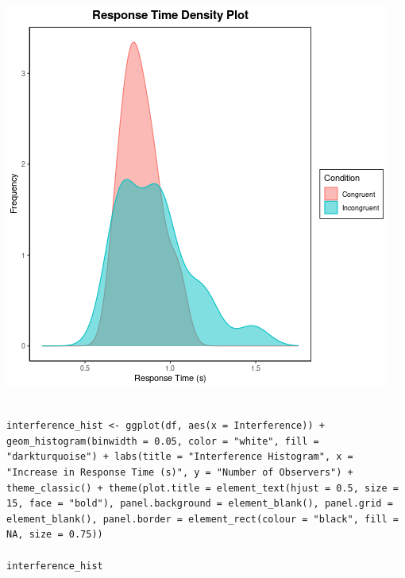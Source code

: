\documentclass{article}
\begin{document}
\begin{center}
\includegraphics[width=.9\linewidth]{converted_stroop3.png}
\end{center}



\begin{verbatim}

interference_hist <- ggplot(df, aes(x = Interference)) + geom_histogram(binwidth = 0.05, color = "white", fill = "darkturquoise") + labs(title = "Interference Histogram", x = "Increase in Response Time (s)", y = "Number of Observers") + theme_classic() + theme(plot.title = element_text(hjust = 0.5, size = 15, face = "bold"), panel.background = element_blank(), panel.grid = element_blank(), panel.border = element_rect(colour = "black", fill = NA, size = 0.75))

interference_hist

\end{verbatim}
\end{document}
